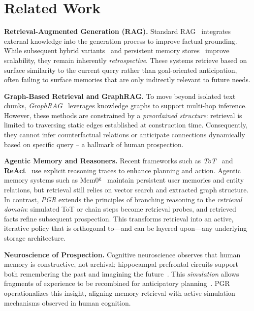 \section{Related Work}
\label{sec:relatedWork}

\noindent
{\bf Retrieval-Augmented Generation (RAG).}
Standard RAG~\cite{lewis2020rag} integrates external knowledge into the generation process to improve factual grounding. While subsequent hybrid variants~\cite{izacard2021fid} and persistent memory stores~\cite{park2023generative} improve scalability, they remain inherently \emph{retrospective}. These systems retrieve based on surface similarity to the current query rather than goal-oriented anticipation, often failing to surface memories that are only indirectly relevant to future needs.

\noindent
{\bf Graph-Based Retrieval and GraphRAG.}
To move beyond isolated text chunks, \textit{GraphRAG}~\cite{edge2024graphrag} leverages knowledge graphs to support multi-hop inference. However, these methods are constrained by a \emph{preordained structure}: retrieval is limited to traversing static edges established at construction time. Consequently, they cannot infer counterfactual relations or anticipate connections dynamically based on specific query -- a hallmark of human prospection.

\noindent
{\bf Agentic Memory and Reasoners.}
Recent frameworks such as \textit{ToT}~\cite{yao2023tree} and \textbf{ReAct}~\cite{yao2023react} use explicit reasoning traces to enhance planning and action. Agentic memory systems such as Mem0$^{\texttt{g}}$~\cite{chhikara2025mem0} maintain persistent user memories and entity relations, but retrieval still relies on vector search and extracted graph structure. In contrast, \textit{PGR} extends the principles of branching reasoning to the \emph{retrieval domain}: simulated ToT or chain steps become retrieval probes, and retrieved facts refine subsequent prospection. This transforms retrieval into an active, iterative policy that is orthogonal to—and can be layered upon—any underlying storage architecture.

\noindent
{\bf Neuroscience of Prospection.}
Cognitive neuroscience observes that human memory is constructive, not archival; hippocampal-prefrontal circuits support both remembering the past and imagining the future~\cite{schacter2017episodic, addis2007constructive}. This \emph{simulation} allows fragments of experience to be recombined for anticipatory planning~\cite{hassabis2007scenes}. PGR operationalizes this insight, aligning memory retrieval with active simulation mechanisms observed in human cognition.